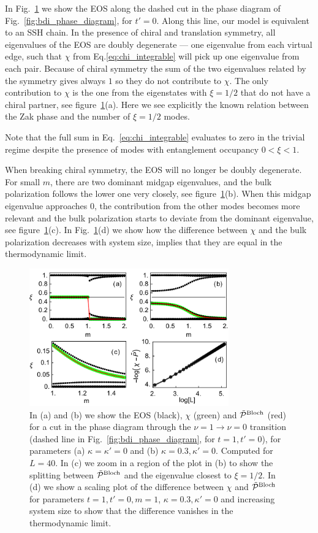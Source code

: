 \documentclass[twocolumn,amsmath,longbibliography,amssymb,superscriptaddress]{revtex4-1}
\newcommand{\carlos}[1]{{\color{red} #1}}
\begin{document}
In Fig.~\ref{huang} we show  the EOS along the dashed cut in the phase diagram of Fig.~\ref{fig:bdi_phase_diagram}, for $t'=0$. 
Along this line, our model is equivalent to an SSH chain. 
In the presence of chiral and translation symmetry, all eigenvalues of the EOS are doubly degenerate --- one eigenvalue from each virtual edge, such that $\chi$ from Eq.\eqref{eq:chi_integrable} will pick up one eigenvalue from each pair. Because of chiral symmetry the sum of the two eigenvalues related by the symmetry gives always $1$ so they do not contribute to $\chi$. The only contribution to $\chi$ is the one from the eigenstates with $\xi=1/2$ that do not have a chiral partner, see figure~\ref{huang}(a). Here we see explicitly the known relation between the Zak phase and the number of $\xi = 1/2$ modes.

Note that the full sum  in Eq.~\eqref{eq:chi_integrable}  evaluates to zero in the trivial regime %
despite the presence of modes with entanglement occupancy $0<\xi<1$. 

When breaking chiral symmetry, the EOS will no longer be doubly degenerate. 
For small $m$, there are two dominant midgap eigenvalues, and the bulk polarization follows the lower one very closely, see figure~\ref{huang}(b).
When this midgap eigenvalue approaches  0, the contribution from the other modes becomes more relevant and the bulk polarization starts to deviate from the dominant eigenvalue, see figure~\ref{huang}(c). In Fig.~\ref{huang}(d) we show how the difference between $\chi$ and the bulk polarization decreases with system size, implies that they are equal in the thermodynamic limit. 


\begin{figure}[t]
\centering
\includegraphics[width=86mm]{fig3comp.pdf}
\caption{In (a) and (b)  we show the EOS (black), $\chi$ (green) and $\tilde{\mathcal{P}}^{\rm Bloch}$ (red) for a cut in the phase diagram through the $\nu = 1 \rightarrow \nu = 0$ transition (dashed line in Fig.~\ref{fig:bdi_phase_diagram}, for $t = 1,t'=0$), for parameters  (a) $\kappa =\kappa'=0$ and (b) $\kappa = 0.3, \kappa'=0$. Computed for $L=40$. In (c) we zoom in a region of the plot in (b) to show the splitting between $\tilde{\mathcal{P}}^{\rm Bloch}$ and the eigenvalue closest to $\xi=1/2$. In (d) we show a scaling plot of the difference between $\chi$ and $\tilde{\mathcal{P}}^{\rm Bloch}$ for parameters $t=1,t'=0,m=1$, $\kappa = 0.3, \kappa'=0$ and increasing system size to show that the difference vanishes in the thermodynamic limit. }
\label{huang}
\end{figure}
\end{document}
